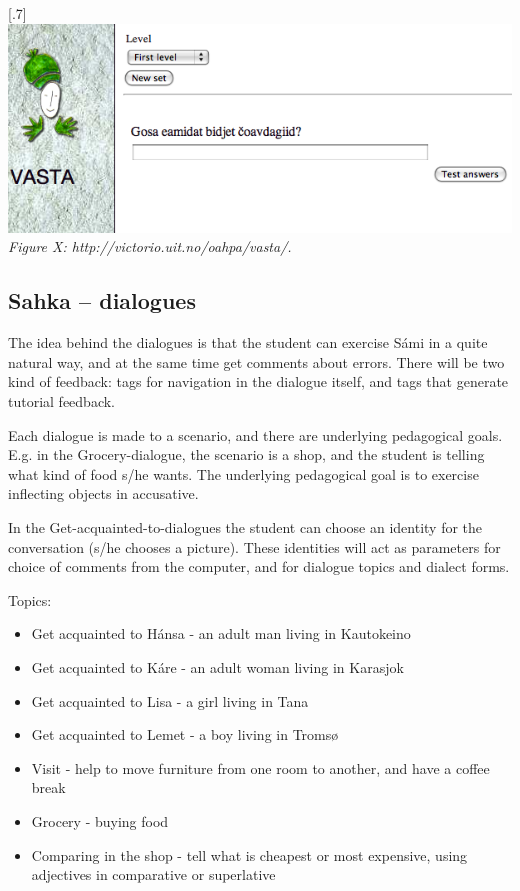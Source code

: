 \documentclass[a4paper,12pt]{article}
\begin{document}
\scalebox{.7}[.7]{\includegraphics{img/vasta.png}}\\
\textit{Figure X: http://victorio.uit.no/oahpa/vasta/.}\\ 

	

\subsection{Sahka -- dialogues}
The idea behind the dialogues is that the student can exercise Sámi in a quite natural way, and at the same time get comments about errors. There will be two kind of feedback: tags for navigation in the dialogue itself, and tags that generate tutorial feedback.

Each dialogue is made to a scenario, and there are underlying pedagogical goals. E.g. in the Grocery-dialogue, the scenario is a shop, and the student is telling what kind of food s/he wants. The underlying pedagogical goal is to exercise inflecting objects in accusative.

In the Get-acquainted-to-dialogues the student can choose an identity for the conversation (s/he chooses a picture). These identities will act as parameters for choice of comments from the computer, and for dialogue topics and dialect forms.

\vspace{0.5cm}
	
Topics:
\begin{itemize}
\item Get acquainted to Hánsa - an adult man living in Kautokeino
\item Get acquainted to Káre - an adult woman living in Karasjok
\item Get acquainted to Lisa - a girl living in Tana
\item Get acquainted to Lemet - a boy living in Tromsø
\item Visit - help to move furniture from one room to another, and have a coffee break
\item Grocery - buying food
\item Comparing in the shop - tell what is cheapest or most expensive, using adjectives in comparative or superlative
\end{itemize}
\end{document}
